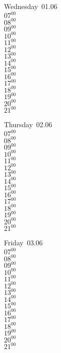 \documentclass[11pt,a4paper]{book}\usepackage[]{graphicx}\usepackage[]{color}
\begin{document}
\begin{weekdaybox}
  Wednesday~01.06\\
  { 
  \vfill
  $07^{00}$\\
$08^{00}$\\
$09^{00}$\\
$10^{00}$\\
$11^{00}$\\
$12^{00}$\\
$13^{00}$\\
$14^{00}$\\
$15^{00}$\\
$16^{00}$\\
$17^{00}$\\
$18^{00}$\\
$19^{00}$\\
$20^{00}$\\
$21^{00}$\\
  }
\end{weekdaybox}
\clearpage
\begin{headerbox}
\end{headerbox}
\begin{weekdaybox}
  Thursday~02.06\\
  { 
  \vfill
  $07^{00}$\\
$08^{00}$\\
$09^{00}$\\
$10^{00}$\\
$11^{00}$\\
$12^{00}$\\
$13^{00}$\\
$14^{00}$\\
$15^{00}$\\
$16^{00}$\\
$17^{00}$\\
$18^{00}$\\
$19^{00}$\\
$20^{00}$\\
$21^{00}$\\
  }
\end{weekdaybox} 
\begin{weekdaybox}
  Friday~03.06\\
  { 
  \vfill
  $07^{00}$\\
$08^{00}$\\
$09^{00}$\\
$10^{00}$\\
$11^{00}$\\
$12^{00}$\\
$13^{00}$\\
$14^{00}$\\
$15^{00}$\\
$16^{00}$\\
$17^{00}$\\
$18^{00}$\\
$19^{00}$\\
$20^{00}$\\
$21^{00}$\\
  }
\end{weekdaybox}
\end{document}
